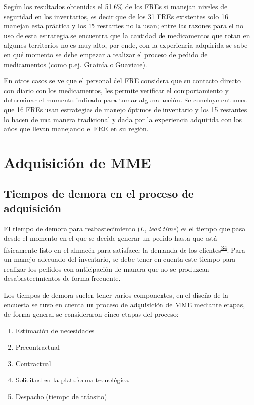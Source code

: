 \documentclass[
]{book}
\begin{document}
Según los resultados obtenidos el 51.6\% de los FREs si manejan niveles de seguridad en los inventarios, es decir que de los 31 FREs existentes solo 16 manejan esta práctica y los 15 restantes no la usan; entre las razones para el no uso de esta estrategia se encuentra que la cantidad de medicamentos que rotan en algunos territorios no es muy alto, por ende, con la experiencia adquirida se sabe en qué momento se debe empezar a realizar el proceso de pedido de medicamentos (como p.ej. Guainía o Guaviare).

En otros casos se ve que el personal del FRE considera que su contacto directo con diario con los medicamentos, les permite verificar el comportamiento y determinar el momento indicado para tomar alguna acción. Se concluye entonces que 16 FREs usan estrategias de manejo óptimos de inventario y los 15 restantes lo hacen de una manera tradicional y dada por la experiencia adquirida con los años que llevan manejando el FRE en su región.

\hypertarget{adquisiciuxf3n-de-mme}{%
\section{Adquisición de MME}\label{adquisiciuxf3n-de-mme}}

\hypertarget{tiempos-de-demora-en-el-proceso-de-adquisiciuxf3n}{%
\subsection{Tiempos de demora en el proceso de adquisición}\label{tiempos-de-demora-en-el-proceso-de-adquisiciuxf3n}}

El tiempo de demora para reabastecimiento (\(L\), \emph{lead time}) es el tiempo que pasa desde el momento en el que se decide generar un pedido hasta que está físicamente listo en el almacén para satisfacer la demanda de los clientes\textsuperscript{\protect\hyperlink{ref-Silver2017}{34}}. Para un manejo adecuado del inventario, se debe tener en cuenta este tiempo para realizar los pedidos con anticipación de manera que no se produzcan desabastecimientos de forma frecuente.

Los tiempos de demora suelen tener varios componentes, en el diseño de la encuesta se tuvo en cuenta un proceso de adquisición de MME mediante etapas, de forma general se consideraron cinco etapas del proceso:

\begin{enumerate}
\def\labelenumi{\arabic{enumi}.}
\item
  Estimación de necesidades
\item
  Precontractual
\item
  Contractual
\item
  Solicitud en la plataforma tecnológica
\item
  Despacho (tiempo de tránsito)
\end{enumerate}
\end{document}
